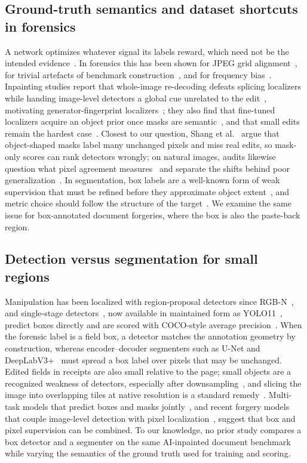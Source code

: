 \subsection{Ground-truth semantics and dataset shortcuts in forensics}
A network optimizes whatever signal its labels reward, which need not be the intended evidence~\cite{geirhos2020shortcut}. In forensics this has been shown for JPEG grid alignment~\cite{wong2025adcdnet,docqt2026}, for trivial artefacts of benchmark construction~\cite{smeu2025shortcuts,yermakov2026gend}, and for frequency bias~\cite{freqbias2025}. Inpainting studies report that whole-image re-decoding defeats splicing localizers while handing image-level detectors a global cue unrelated to the edit~\cite{mareen2024tgif,nebioglu2026inpx}, motivating generator-fingerprint localizers~\cite{giakoumoglou2026diffusionprint}; they also find that fine-tuned localizers acquire an object prior once masks are semantic~\cite{mareen2026tgif2}, and that small edits remain the hardest case~\cite{pandolfini2025localized,cai2026zooming}. Closest to our question, Shang et al.~\cite{shang2026maskspixels} argue that object-shaped masks label many unchanged pixels and miss real edits, so mask-only scores can rank detectors wrongly; on natural images, audits likewise question what pixel agreement measures~\cite{aoudi2026beyond} and separate the shifts behind poor generalization~\cite{giftbench2026}. In segmentation, box labels are a well-known form of weak supervision that must be refined before they approximate object extent~\cite{dai2015boxsup,tian2021boxinst}, and metric choice should follow the structure of the target~\cite{maierhein2024metrics}. We examine the same issue for box-annotated document forgeries, where the box is also the paste-back region.

\subsection{Detection versus segmentation for small regions}
Manipulation has been localized with region-proposal detectors since RGB-N~\cite{zhou2018rgbn}, and single-stage detectors~\cite{redmon2016yolo}, now available in maintained form as YOLO11~\cite{jocher2024yolo11}, predict boxes directly and are scored with COCO-style average precision~\cite{lin2014coco}. When the forensic label is a field box, a detector matches the annotation geometry by construction, whereas encoder--decoder segmenters such as U-Net and DeepLabV3+~\cite{ronneberger2015unet,chen2018deeplabv3plus} must spread a box label over pixels that may be unchanged. Edited fields in receipts are also small relative to the page; small objects are a recognized weakness of detectors, especially after downsampling~\cite{cheng2023smallobject}, and slicing the image into overlapping tiles at native resolution is a standard remedy~\cite{akyon2022sahi}. Multi-task models that predict boxes and masks jointly~\cite{he2017maskrcnn}, and recent forgery models that couple image-level detection with pixel localization~\cite{guangjian2026defakerone}, suggest that box and pixel supervision can be combined. To our knowledge, no prior study compares a box detector and a segmenter on the same AI-inpainted document benchmark while varying the semantics of the ground truth used for training and scoring.
